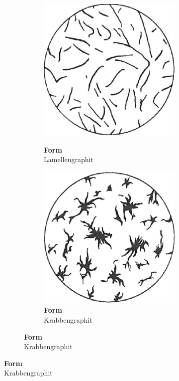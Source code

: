 \documentclass[
fontsize=10pt, 
listof = totoc,
parskip = half	
]{report}
\newcommand{\uproman}[1]{\uppercase\expandafter{\romannumeral#1}}
\begin{document}
\begin{figure}[h]
	\begin{subfigure}{1.0\textwidth}
		\begin{subfigure}{0.33\textwidth}
			\centering
			\includegraphics[scale=0.25]{pics/graphit_form1}
			\label{fig:LamellenGraphit}
			\caption*{\textbf{Form \uproman{1}}\\Lamellengraphit}
		\end{subfigure}\hfill
		\begin{subfigure}{0.33\textwidth}
			\centering
			\includegraphics[scale=0.25]{pics/graphit_form2}
			\caption*{\textbf{Form \uproman{2}}\\Krabbengraphit}

\end{subfigure}
\end{subfigure}
\end{figure}
\end{document}
